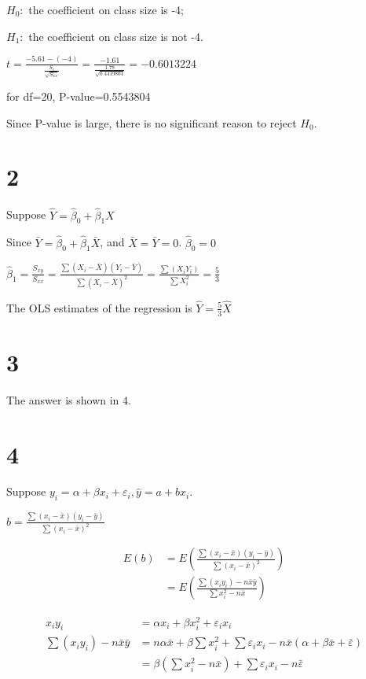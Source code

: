 \documentclass{article}
\begin{document}
$H_0:$ the coefficient on class size is -4;

$H_1:$ the coefficient on class size is not -4.

$t=\frac{-5.61-(-4)}{\frac{S_e}{\sqrt{S_{xx}}}}=\frac{-1.61}{\frac{1.78}{\sqrt{0.4419804}}}=-0.6013224$

for df=20, P-value=0.5543804

Since P-value is large, there is no significant reason to reject $H_0$.

\section*{2}

Suppose $\hat{Y}=\hat{\beta}_0+\hat{\beta}_1X$

Since $\bar{Y}=\hat{\beta}_0+\hat{\beta}_1\bar{X}$, and $\bar{X}=\bar{Y}=0$. $\hat{\beta}_0=0$

$\hat{\beta}_1=\frac{S_{xy}}{S_{xx}}=\frac{\sum(X_i-\bar{X})(Y_i-\bar{Y})}{\sum(X_i-\bar{X})^2}=\frac{\sum(X_iY_i)}{\sum X_i^2}=\frac{5}{3}$

The OLS estimates of the regression is $\hat{Y}=\frac{5}{3}\hat{X}$

\section*{3}

The answer is shown in 4.

\section*{4}
Suppose $y_i=\alpha+\beta x_i+\varepsilon_i, \hat{y}=a+bx_i$.

$b=\frac{\sum{(x_i-\bar{x})(y_i-\bar{y})}}{\sum{(x_i-\bar{x})^2}}$

\begin{equation*}
	\begin{split}
		E(b)&=E(\frac{\sum{(x_i-\bar{x})(y_i-\bar{y})}}{\sum{(x_i-\bar{x})^2}})\\
		&=E(\frac{\sum(x_iy_i)-n\bar{x}\bar{y}}{\sum x_i^2-n\bar{x}})
	\end{split}
\end{equation*}

\begin{equation*}
	\begin{split}
		x_iy_i&=\alpha x_i+\beta x_i^2+\varepsilon_ix_i\\
		\sum(x_iy_i)-n\bar{x}\bar{y}&=n\alpha\bar{x}+\beta\sum x_i^2+\sum \varepsilon_i x_i-n\bar{x}(\alpha+\beta\bar{x}+\bar{\varepsilon})\\
		&=\beta(\sum x_i^2-n\bar{x})+\sum \varepsilon_i x_i-n\bar{\varepsilon}
	\end{split}
\end{equation*}
\end{document}
